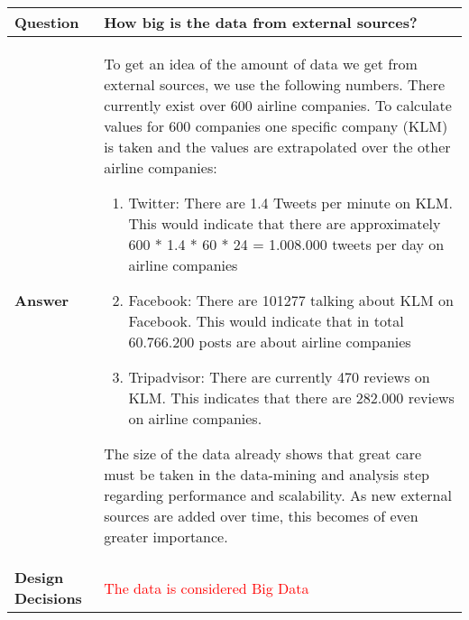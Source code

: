 \begin{longtable}{| l |  p{12cm} |}
\hline
\textbf{Question} & \textbf{How big is the data from external sources?} \\ \hline
\textbf{Answer} &
	To get an idea of the amount of data we get from external sources, we use the following numbers. There currently exist over 600 airline companies. To calculate values for 600 companies one specific company (KLM) is taken and the values are extrapolated over the other airline companies:
\begin{enumerate}
\item Twitter: There are 1.4 Tweets per minute on KLM. This would indicate that there are approximately 600 * 1.4 * 60 * 24 = 1.008.000 tweets per day on airline companies
\item Facebook: There are 101277 talking about KLM on Facebook. This would indicate that in total 60.766.200 posts are about airline companies
\item Tripadvisor: There are currently 470 reviews on KLM. This indicates that there are 282.000 reviews on airline companies.
\end{enumerate}
The size of the data already shows that great care must be taken in the data-mining and analysis step regarding performance and scalability. As new external sources are added over time, this becomes of even greater importance. \\ \hline
\textbf{Design Decisions} & \textcolor{red}{The data is considered Big Data} \\ \hline
\end{longtable}


